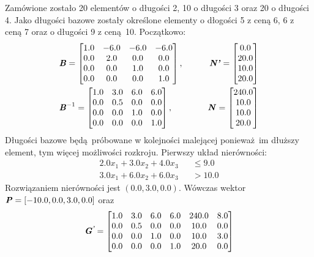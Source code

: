 Zamówione zostało 20 elementów o długości 2, 10 o długości 3 oraz 20 o długości 4. Jako długości bazowe zostały określone elementy o dłogości 5 z ceną 6, 6 z ceną 7 oraz o długości 9 z ceną 10. \newline
Początkowo:
\begin{equation*}
  \begin{aligned}
    &\textbf{\textit{B}} =
    \begin{bmatrix}
      1.0 & -6.0 & -6.0 & -6.0 \\
      0.0 & 2.0 & 0.0 & 0.0 \\
      0.0 & 0.0 & 1.0 & 0.0 \\
      0.0 & 0.0 & 0.0 & 1.0
    \end{bmatrix}, \qquad
    &\textbf{\textit{N'}} =
    \begin{bmatrix}
      0.0\\
      20.0\\
      10.0\\
      20.0
    \end{bmatrix} \\
    &\textbf{\textit{B}}^{-1} =
    \begin{bmatrix}
      1.0 & 3.0 & 6.0 & 6.0 \\
      0.0 & 0.5 & 0.0 & 0.0 \\
      0.0 & 0.0 & 1.0 & 0.0 \\
      0.0 & 0.0 & 0.0 & 1.0
    \end{bmatrix}, \quad
    &\textbf{\textit{N}} =
    \begin{bmatrix}
      240.0\\
      10.0\\
      10.0\\
      20.0
    \end{bmatrix}
  \end{aligned}
\end{equation*}
Długości bazowe będą próbowane w kolejności malejącej ponieważ im dłuższy element, tym więcej możliwości rozkroju. Pierwszy układ nierówności:
\begin{equation*}
  \begin{aligned}
    2.0 x_{1}+ 3.0 x_{2}+ 4.0 x_{3} & &\le 9.0 \\
    3.0 x_{1}+ 6.0 x_{2}+ 6.0 x_{3} & &> 10.0
  \end{aligned}
\end{equation*}
Rozwiązaniem nierówności jest $(0.0,3.0,0.0)$. Wówczas wektor $\textbf{\textit{P}} = [-10.0, 0.0, 3.0, 0.0]$ oraz
\begin{equation*}
  \begin{aligned}
    \textbf{\textit{G\textsuperscript{'}}} =
    \begin{bmatrix}
      1.0 & 3.0 & 6.0 & 6.0 & 240.0 & 8.0  \\
      0.0 & 0.5 & 0.0 & 0.0 & 10.0 & 0.0 \\
      0.0 & 0.0 & 1.0 & 0.0 & 10.0 & 3.0 \\
      0.0 & 0.0 & 0.0 & 1.0 & 20.0 & 0.0
    \end{bmatrix}
  \end{aligned}
\end{equation*}
